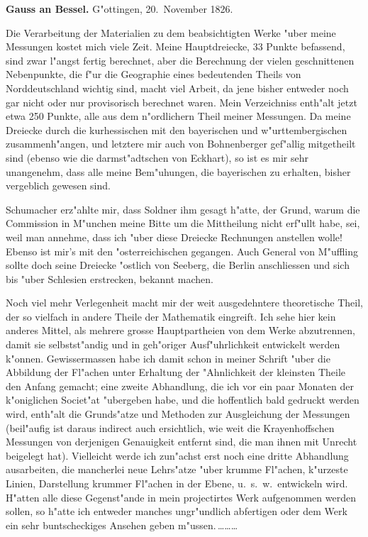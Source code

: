 \documentclass[12pt,a4paper]{article}
\theoremstyle{plain}
\theoremstyle{definition}
\theoremstyle{remark}
\begin{document}
\newpage
\noindent \textbf{Gauss an Bessel.} G"ottingen, 20.~November 1826.

\medskip
\noindent Die Verarbeitung der Materialien zu dem beabsichtigten Werke "uber meine Messungen kostet mich viele Zeit. Meine Hauptdreiecke, 33 Punkte befassend, sind zwar l"angst fertig berechnet, aber die Berechnung der vielen geschnittenen Nebenpunkte, die f"ur die Geographie eines bedeutenden Theils von Norddeutschland wichtig sind, macht viel Arbeit, da jene bisher entweder noch gar nicht oder nur provisorisch berechnet waren. Mein Verzeichniss enth"alt jetzt etwa 250 Punkte, alle aus dem n"ordlichern Theil meiner Messungen. Da meine Dreiecke durch die kurhessischen mit den bayerischen und w"urttembergischen zusammenh"angen, und letztere mir auch von Bohnenberger gef"allig mitgetheilt sind (ebenso wie die darmst"adtschen von Eckhart), so ist es mir sehr unangenehm, dass alle meine Bem"uhungen, die bayerischen zu erhalten, bisher vergeblich gewesen sind.

Schumacher erz"ahlte mir, dass Soldner ihm gesagt h"atte, der Grund, warum die Commission in M"unchen meine Bitte um die Mittheilung nicht erf"ullt habe, sei, weil man annehme, dass ich "uber diese Dreiecke Rechnungen anstellen wolle! Ebenso ist mir's mit den "osterreichischen gegangen. Auch General von M"uffling sollte doch seine Dreiecke "ostlich von Seeberg, die Berlin anschliessen und sich bis "uber Schlesien erstrecken, bekannt machen.

Noch viel mehr Verlegenheit macht mir der weit ausgedehntere theoretische Theil, der so vielfach in andere Theile der Mathematik eingreift. Ich sehe hier kein anderes Mittel, als mehrere grosse Hauptpartheien von dem Werke abzutrennen, damit sie selbstst"andig und in geh"origer Ausf"uhrlichkeit entwickelt werden k"onnen. Gewissermassen habe ich damit schon in meiner Schrift "uber die Abbildung der Fl"achen unter Erhaltung der "Ahnlichkeit der kleinsten Theile den Anfang gemacht; eine zweite Abhandlung, die ich vor ein paar Monaten der k"oniglichen Societ"at "ubergeben habe, und die hoffentlich bald gedruckt werden wird, enth"alt die Grunds"atze und Methoden zur Ausgleichung der Messungen (beil"aufig ist daraus indirect auch ersichtlich, wie weit die Krayenhoffschen Messungen von derjenigen Genauigkeit entfernt sind, die man ihnen mit Unrecht beigelegt hat). Vielleicht werde ich zun"achst erst noch eine dritte Abhandlung ausarbeiten, die mancherlei neue Lehrs"atze "uber krumme Fl"achen, k"urzeste Linien, Darstellung krummer Fl"achen in der Ebene, u.\ s.\ w.\ entwickeln wird. H"atten alle diese Gegenst"ande in mein projectirtes Werk aufgenommen werden sollen, so h"atte ich entweder manches ungr"undlich abfertigen oder dem Werk ein sehr buntscheckiges Ansehen geben m"ussen.\,\ldots\ldots\ldots
\end{document}
